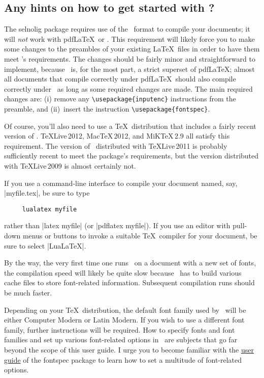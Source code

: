 \documentclass[12pt]{article}
\newcommand{\pkg}[1]{\textsf{#1}}
\begin{document}
\subsection{Any hints on how to get started with \LuaLaTeX?}

The \pkg{selnolig} package requires use of the \LuaLaTeX\ format to compile your documents; it will \emph{not} work with pdf\LaTeX\ or \XeLaTeX. This requirement will likely force you to make some changes to the preambles of your existing \LaTeX\ files in order to have them meet \LuaLaTeX's requirements. The changes should be fairly minor and straightforward to implement, because \LuaLaTeX\ is, for the most part, a strict superset of pdf\LaTeX; almost all documents that compile correctly under pdf\LaTeX\ should also compile correctly under \LuaLaTeX\, as long as some required changes are made.
The main required changes are: (i) remove any \Verb+\usepackage{inputenc}+ instructions from the preamble, and (ii)~insert the instruction
\Verb+\usepackage{fontspec}+.

Of course, you'll also need to use a \TeX\ distribution that includes a fairly recent version of \LuaLaTeX. \TeX Live\,2012, Mac\TeX\,2012, and MiK\TeX\,2.9 all satisfy this requirement. The version of \LuaLaTeX\ distributed with TeXLive\,2011 is probably sufficiently recent to meet the package's requirements, but the version distributed with TeXLive\,2009 is almost certainly not. 

If you use a command-line interface to compile your document named, say, |myfile.tex|, be sure to type 
\begin{Verbatim}
     lualatex myfile
\end{Verbatim}
rather than |latex myfile| (or |pdflatex myfile|). If you use an editor with pull-down menus or buttons to invoke a suitable \TeX\ compiler for your document, be sure to select |LuaLaTeX|. 

By the way, the very first time one runs \LuaLaTeX\ on a document with a new set of fonts, the compilation speed will likely be quite slow because \LuaLaTeX\ has to build various cache files to store font-related information. Subsequent compilation runs should be much faster. 

Depending on your \TeX\ distribution, the default font family used by \LuaLaTeX\ will be either Computer Modern or Latin Modern. If you wish to use a different font family, further instructions will be required. How to specify fonts and font families and set up various font-related options in \LuaLaTeX\ are subjects that go far beyond the scope of this user guide. I urge you to become familiar with the \href{http://www.ctan.org/tex-archive/macros/latex/contrib/fontspec/fontspec.pdf}{user guide} of the \pkg{fontspec} package to learn how to set a multitude of font-related options.
\end{document}
